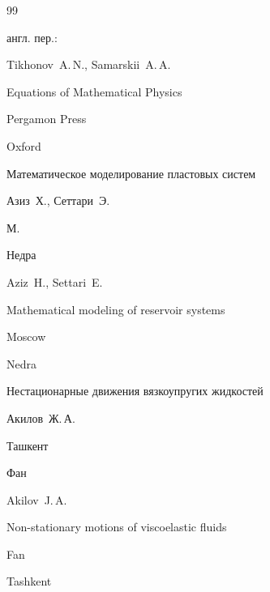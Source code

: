 \begin{thebibliography}{99}


\transl англ. пер.:~

\by Tikhonov~A.\,N., Samarskii~A.\,A.

\book Equations of Mathematical Physics 

\publ Pergamon Press

\publaddr Oxford









\book Математическое моделирование пластовых систем

\by  Азиз~Х., Сеттари~Э.

\publaddr М.

\publ Недра



\misctransl

\by Aziz~H., Settari~E.

\book Mathematical modeling of reservoir systems

\publaddr Moscow

\publ Nedra







\book Нестационарные движения вязкоупругих жидкостей

\by  Акилов~Ж.\,А.

\publaddr Ташкент

\publ Фан



\misctransl

\by Akilov~J.\,A.

\book Non-stationary motions of viscoelastic fluids

\publ Fan

\publaddr Tashkent









\end{thebibliography}
